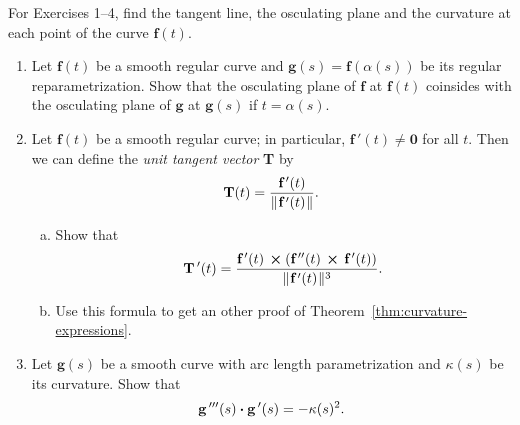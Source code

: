 \startexercises\label{sec1dot9}
\par\noindent For Exercises 1--4, 
find the tangent line, 
the osculating plane and the curvature at each point of the curve  $\textbf{f}(t)$.
\begin{enumerate}[\bfseries 1.]


  
[{[\bfseries 1.]}]
  \item Let $\textbf{f}(t)$ be a smooth regular curve and $\textbf{g}(s)=\textbf{f}(\alpha(s))$ be its regular reparametrization. Show that the osculating plane of $\textbf{f}$ at $\textbf{f}(t)$ coinsides with the osculating plane of $\textbf{g}$ at $\textbf{g}(s)$ if $t=\alpha(s)$.  
  
   \item Let $\textbf{f}(t)$ be a smooth regular curve; in particular, $\textbf{f}\,'(t) \ne \textbf{0}$ for all $t$. Then we can
  define the \emph{unit tangent vector} \textbf{T} by
  \begin{displaymath}
   \textbf{T}(t) = \dfrac{\textbf{f}\,'(t)}{\lVert\mspace{1mu}\textbf{f}\,'(t)\mspace{1mu}\rVert} .
  \end{displaymath}
   \begin{enumerate}[(a)]
  \item 
  Show that
  \begin{displaymath}
   \textbf{T}\,'(t) = \dfrac{\textbf{f}\,'(t)\, \bm{\times} (\textbf{f}\,''(t)\, \bm{\times} \,\textbf{f}\,'(t))}{
    \lVert\mspace{1mu}\textbf{f}\,'(t)\mspace{1mu}\rVert^3} .
  \end{displaymath}
  \item Use this formula to get an other proof of Theorem~\ref{thm:curvature-expressions}.
   \end{enumerate}
   \item\label{ex:g'''} Let $\textbf{g}(s)$ be a smooth curve with arc length parametrization and $\kappa(s)$ be its curvature.
  Show that 
  \[\textbf{g}\,'''(s) \bm{\cdot} \textbf{g}\,'(s)=-\kappa(s)^2.\]
  

\end{enumerate}
